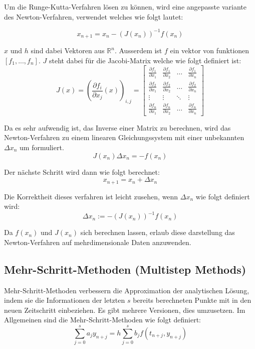 Um die Runge-Kutta-Verfahren lösen zu können, 
wird eine angepasste variante des Newton-Verfahren, 
verwendet welches wie folgt lautet:

$$
x_{n+1} = x_n - (J(x_n))^{-1} f(x_n)
$$

$x$ und $h$ sind dabei Vektoren aus $\mathbb{R}^n$. 
Ausserdem ist $f$ ein vektor von funktionen $[f_1, ..., f_n]$.
$J$ steht dabei für die Jacobi-Matrix welche wie folgt definiert ist:
$$
J(x) = \left( \frac{\partial f_i}{\partial x_j}(x) \right)_{i, j} = \begin{bmatrix}
\frac{\partial f_1}{\partial x_1} & \frac{\partial f_1}{\partial x_2} & \dots & \frac{\partial f_1}{\partial x_n} \\
\frac{\partial f_2}{\partial x_1} & \frac{\partial f_2}{\partial x_2} & \dots & \frac{\partial f_2}{\partial x_n} \\
\vdots & \vdots & \ddots & \vdots \\
\frac{\partial f_n}{\partial x_1} & \frac{\partial f_n}{\partial x_2} & \dots & \frac{\partial f_n}{\partial x_n}
\end{bmatrix}
$$

Da es sehr aufwendig ist, das Inverse einer Matrix zu berechnen, wird das Newton-Verfahren zu einem linearen Gleichungssystem mit einer unbekannten $\Delta x_n$ um formuliert.
$$
J(x_n) \Delta x_n = -f(x_n)
$$

Der nächste Schritt wird dann wie folgt berechnet:
$$
x_{n+1} = x_n + \Delta x_n
$$

Die Korrektheit dieses verfahren ist leicht zusehen, wenn $\Delta x_n $
wie folgt definiert wird:
$$
\Delta x_n := -(J(x_n))^{-1} f(x_n)
$$

Da $f(x_n)$ und $J(x_n)$ sich berechnen lassen, 
erlaub diese darstellung das Newton-Verfahren auf mehrdimensionale Daten anzuwenden. 


\subsection{Mehr-Schritt-Methoden (Multistep Methods)} \label{sec:multi_step}

Mehr-Schritt-Methoden \cite[Kapitel~III.1]{ode1} verbessern die Approximation der analytischen Lösung, indem sie 
die Informationen der letzten $s$ bereits berechneten Punkte mit in den neuen Zeitschritt einbeziehen.
Es gibt mehrere Versionen, dies umzusetzen.
Im Allgemeinen sind die Mehr-Schritt-Methoden wie folgt definiert:
$$
\sum_{j= 0}^{s} a_j y_{n+j} = h \sum_{j=0}^s b_j f(t_{n+j}, y_{n+j})
$$

